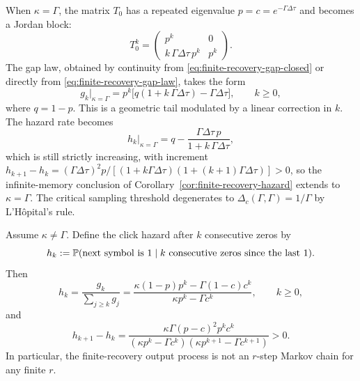 \begin{remark}[The degenerate case $\kappa=\Gamma$]\label{rem:kappa-equals-gamma}
When $\kappa=\Gamma$, the matrix $T_0$ has a repeated eigenvalue $p=c=e^{-\Gamma\Delta\tau}$ and becomes a Jordan block:
\[
T_0^k=
\begin{pmatrix}
p^k&0\\[1mm]
k\,\Gamma\Delta\tau\, p^k&p^k
\end{pmatrix}.
\]
The gap law, obtained by continuity from \eqref{eq:finite-recovery-gap-closed} or directly from \eqref{eq:finite-recovery-gap-law}, takes the form
\begin{equation}\label{eq:gap-law-degenerate}
g_k\big|_{\kappa=\Gamma}
=
p^k\bigl[q(1+k\,\Gamma\Delta\tau)-\Gamma\Delta\tau\bigr],
\qquad k\ge 0,
\end{equation}
where $q=1-p$. This is a geometric tail modulated by a linear correction in $k$. The hazard rate becomes
\[
h_k\big|_{\kappa=\Gamma}
=
q-\frac{\Gamma\Delta\tau\, p}{1+k\,\Gamma\Delta\tau},
\]
which is still strictly increasing, with increment $h_{k+1}-h_k=(\Gamma\Delta\tau)^2 p/[(1+k\Gamma\Delta\tau)(1+(k+1)\Gamma\Delta\tau)]>0$, so the infinite-memory conclusion of Corollary~\ref{cor:finite-recovery-hazard} extends to $\kappa=\Gamma$. The critical sampling threshold degenerates to $\Delta_c(\Gamma,\Gamma)=1/\Gamma$ by L'H\^opital's rule.
\end{remark}

\begin{corollary}\label{cor:finite-recovery-hazard}
Assume $\kappa\neq\Gamma$. Define the click hazard after $k$ consecutive zeros by
\[
h_k:=\mathbb{P}(\text{next symbol is }1\mid \text{$k$ consecutive zeros since the last }1).
\]
Then
\begin{equation}\label{eq:finite-recovery-hazard}
h_k=
\frac{g_k}{\sum_{j\ge k}g_j}
=
\frac{\kappa(1-p)p^k-\Gamma(1-c)c^k}{\kappa p^k-\Gamma c^k},
\qquad k\ge 0,
\end{equation}
and
\begin{equation}\label{eq:finite-recovery-hazard-difference}
h_{k+1}-h_k
=
\frac{\kappa\Gamma(p-c)^2p^kc^k}
{(\kappa p^k-\Gamma c^k)(\kappa p^{k+1}-\Gamma c^{k+1})}
>0.
\end{equation}
In particular, the finite-recovery output process is not an $r$-step Markov chain for any finite $r$.
\end{corollary}

